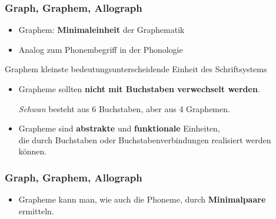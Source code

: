\begin{frame}
\frametitle{Graph, Graphem, Allograph}

\begin{itemize}
	\item Graphem: \textbf{Minimaleinheit} der Graphematik

	\item Analog zum Phonembegriff in der Phonologie
\end{itemize}

\begin{block}{Graphem}
kleinste bedeutungsunterscheidende Einheit des Schriftsystems
\end{block}

\pause 

\begin{itemize}
	\item Grapheme sollten \textbf{nicht mit Buchstaben verwechselt werden}.

	\ea \emph{Schwan} besteht aus 6 Buchstaben, aber aus 4 Graphemen.
	\z 
	 	
	\item Grapheme sind \textbf{abstrakte} und \textbf{funktionale} Einheiten,\\
	die durch Buchstaben oder Buchstabenverbindungen realisiert werden können.
\end{itemize}

\end{frame}


\begin{frame}
\frametitle{Graph, Graphem, Allograph}

\begin{itemize}
	\item Grapheme kann man, wie auch die Phoneme, durch \textbf{Minimalpaare} ermitteln.
	
	\pause
	 
\settowidth{} 

	\ea {} \vs {} 
	
	\ex {} \vs {} 
	
	\ex {} \vs {} 
	
	\ex {} \vs {} 
	\z
\end{itemize}

\end{frame}


